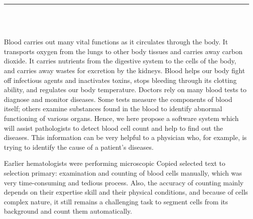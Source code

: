 \pagestyle{myfancy}

\vspace*{-0.2in}

\setcounter{page}{1}

\begin{center}
    {\color{Black} \rule{6.2in}{1.4mm} }\\
    \vspace{0.1in}
    \scshape{\fontsize{34}{46}{\bfseries{\color{Black}{Introduction}}}}
    \\
    \vspace{0.5in}
\end{center}
\hspace*{0.16in}

Blood carries out many vital functions as it circulates through the body. It transports oxygen from the lungs to other body tissues and carries away carbon dioxide. It carries nutrients from the digestive system to the cells of the body, and carries away wastes for excretion by the kidneys. Blood helps our body fight off infectious agents and inactivates toxins, stops bleeding through its clotting ability, and regulates our body temperature. Doctors rely on many blood tests to diagnose and monitor diseases. Some tests measure the components of blood itself; others examine substances found in the blood to identify abnormal functioning of various organs. Hence, we here propose a software system which will assist pathologists to detect blood cell count and help to find out the diseases. This information can be very helpful to a physician who, for example, is trying to identify the cause of a patient's diseases.

Earlier hematologists were performing microscopic Copied selected text to selection primary: examination and counting of blood cells manually, which  was very time-consuming and tedious process. Also, the accuracy of counting mainly depends on their expertise skill and their physical conditions, and because of cells complex nature, it still remains a challenging task to segment cells from its background and count them automatically.

